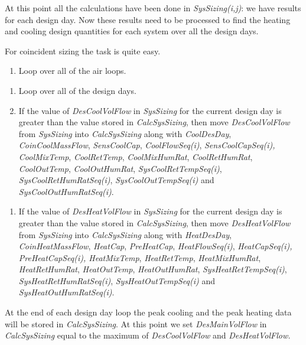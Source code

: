 At this point all the calculations have been done in \emph{SysSizing(i,j)}: we have results for each design day. Now these results need to be processed to find the heating and cooling design quantities for each system over all the design days.

For coincident sizing the task is quite easy.

\begin{enumerate}
\def\labelenumi{(\arabic{enumi})}
\tightlist
\item
  Loop over all of the air loops. 
\end{enumerate}

\begin{enumerate}
\def\labelenumi{(\alph{enumi})}
\item
  Loop over all of the design days.
\item
  If the value of \emph{DesCoolVolFlow} in \emph{SysSizing} for the current design day is greater than the value stored in \emph{CalcSysSizing}, then move \emph{DesCoolVolFlow} from \emph{SysSizing} into \emph{CalcSysSizing} along with \emph{CoolDesDay}, \emph{CoinCoolMassFlow}, \emph{SensCoolCap}, \emph{CoolFlowSeq(i)}, \emph{SensCoolCapSeq(i),} \emph{CoolMixTemp}, \emph{CoolRetTemp}, \emph{CoolMixHumRat}, \emph{CoolRetHumRat}, \emph{CoolOutTemp}, \emph{CoolOutHumRat}, \emph{SysCoolRetTempSeq(i)}, \emph{SysCoolRetHumRatSeq(i)}, \emph{SysCoolOutTempSeq(i)} and \emph{SysCoolOutHumRatSeq(i)}. 
\end{enumerate}

\begin{enumerate}
\def\labelenumi{(\roman{enumi})}
\setcounter{enumi}{1}
\tightlist
\item
  If the value of \emph{DesHeatVolFlow} in \emph{SysSizing} for the current design day is greater than the value stored in \emph{CalcSysSizing}, then move \emph{DesHeatVolFlow} from \emph{SysSizing} into \emph{CalcSysSizing} along with \emph{HeatDesDay}, \emph{CoinHeatMassFlow}, \emph{HeatCap}, \emph{PreHeatCap}, \emph{HeatFlowSeq(i)}, \emph{HeatCapSeq(i),} \emph{PreHeatCapSeq(i), HeatMixTemp}, \emph{HeatRetTemp}, \emph{HeatMixHumRat}, \emph{HeatRetHumRat}, \emph{HeatOutTemp}, \emph{HeatOutHumRat}, \emph{SysHeatRetTempSeq(i)}, \emph{SysHeatRetHumRatSeq(i)}, \emph{SysHeatOutTempSeq(i)} and \emph{SysHeatOutHumRatSeq(i)}.
\end{enumerate}

At the end of each design day loop the peak cooling and the peak heating data will be stored in \emph{CalcSysSizing}. At this point we set \emph{DesMainVolFlow} in \emph{CalcSysSizing} equal to the maximum of \emph{DesCoolVolFlow} and \emph{DesHeatVolFlow.}

